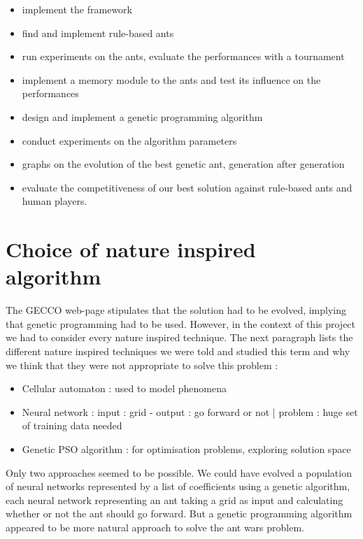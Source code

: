 \documentclass[10pt,a4paper]{article}
\begin{document}
\begin{itemize}
\item implement the framework
\item find and implement rule-based ants
\item run experiments on the ants, evaluate the performances with a tournament
\item implement a memory module to the ants and test its influence on the performances
\item design and implement a genetic programming algorithm
\item conduct experiments on the algorithm parameters
\item graphs on the evolution of the best genetic ant, generation after generation
\item evaluate the competitiveness of our best solution against
  rule-based ants and human players.
\end{itemize}

\section{Choice of nature inspired algorithm}

The GECCO web-page stipulates that the solution had to be evolved,
implying that genetic programming had to be used. However, in the
context of this project we had to consider every nature inspired
technique. The next paragraph lists the different nature inspired
techniques we were told and studied this term and why we think that
they were not appropriate to solve this problem :

\begin{itemize}
\item Cellular automaton : used to model phenomena
\item Neural network : input : grid - output : go forward or not |
  problem : huge set of training data needed
\item Genetic \amp PSO algorithm : for optimisation problems, exploring solution space
\end{itemize}

Only two approaches seemed to be possible. We could have evolved a
population of neural networks represented by a list of coefficients
using a genetic algorithm, each neural network representing an ant
taking a grid as input and calculating whether or not the ant should
go forward. But a genetic programming algorithm appeared to be more
natural approach to solve the ant wars problem.
\end{document}
